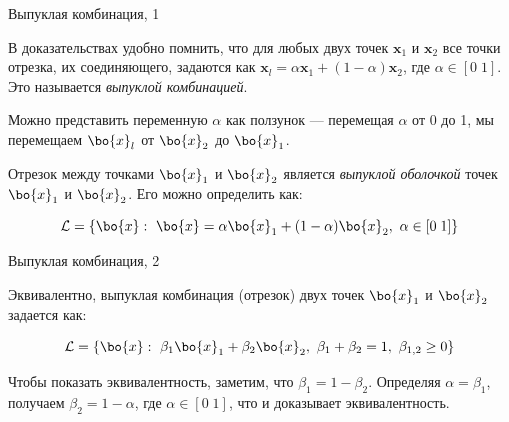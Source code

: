 \documentclass{beamer}
\begin{document}
\begin{frame}{Выпуклая комбинация, 1}
	\begin{flushleft}
		
		В доказательствах удобно помнить, что для любых двух точек $\mathbf{x}_1$ и $\mathbf{x}_2$ все точки отрезка, их соединяющего, задаются как $\mathbf{x}_l = \alpha \mathbf{x}_1 + (1 - \alpha) \mathbf{x}_2$, где $\alpha \in [0 \; 1]$. Это называется \emph{выпуклой комбинацией}.
		
		\bigskip
		
		Можно представить переменную $\alpha$ как ползунок — перемещая $\alpha$ от 0 до 1, мы перемещаем $\bo{x}_l$ от $\bo{x}_2$ до $\bo{x}_1$.
		
		\bigskip
		
		Отрезок между точками $\bo{x}_1$ и $\bo{x}_2$ является \emph{выпуклой оболочкой} точек $\bo{x}_1$ и $\bo{x}_2$. Его можно определить как:
		
		\begin{equation}
			\mathcal{L} = \{ \bo{x}: \ \bo{x}=\alpha \bo{x}_1 + (1 - \alpha) \bo{x}_2, \ \alpha \in [0 \; 1] \}
		\end{equation}
		
	\end{flushleft}
\end{frame}

\begin{frame}{Выпуклая комбинация, 2}
	\begin{flushleft}
		
		Эквивалентно, выпуклая комбинация (отрезок) двух точек $\bo{x}_1$ и $\bo{x}_2$ задается как:
		
		\begin{equation}
			\mathcal{L} = \{ \bo{x}: \ \beta_1 \bo{x}_1 + \beta_2 \bo{x}_2, \ \beta_1+\beta_2 = 1, \ \beta_{1, 2} \geq 0 \}
		\end{equation}
		
		Чтобы показать эквивалентность, заметим, что $\beta_1 = 1 - \beta_2$. Определяя $\alpha = \beta_1$, получаем $\beta_2 = 1 - \alpha$, где $\alpha \in [0 \; 1]$, что и доказывает эквивалентность.
		
	\end{flushleft}
\end{frame}
\end{document}
